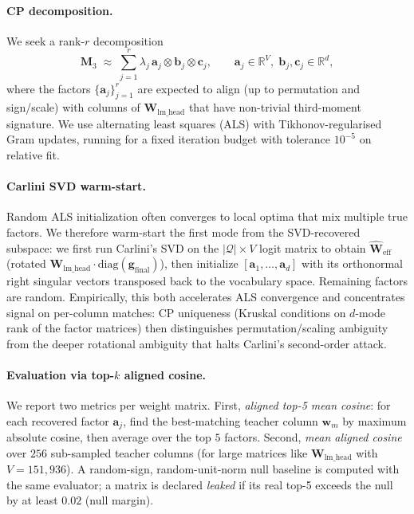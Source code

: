 \documentclass{article}
\newcommand{\R}{\mathbb{R}}
\newcommand{\cQ}{\mathcal{Q}}
\newcommand{\bW}{\mathbf{W}}
\newcommand{\bM}{\mathbf{M}}
\begin{document}
\paragraph{CP decomposition.} We seek a rank-$r$ decomposition
\begin{equation}\label{eq:cp}
 \bM_3 \;\approx\; \sum_{j=1}^{r} \lambda_j \, \mathbf{a}_j \otimes \mathbf{b}_j \otimes \mathbf{c}_j,
 \qquad \mathbf{a}_j \in \R^V,\; \mathbf{b}_j, \mathbf{c}_j \in \R^d,
\end{equation}
where the factors $\{\mathbf{a}_j\}_{j=1}^r$ are expected to align (up to permutation and sign/scale) with columns of $\bW_{\text{lm\_head}}$ that have non-trivial third-moment signature. We use alternating least squares (ALS) with Tikhonov-regularised Gram updates, running for a fixed iteration budget with tolerance $10^{-5}$ on relative fit.

\paragraph{Carlini SVD warm-start.} Random ALS initialization often converges to local optima that mix multiple true factors. We therefore warm-start the first mode from the SVD-recovered subspace: we first run Carlini's SVD on the $|\cQ| \times V$ logit matrix to obtain $\hat{\bW}_{\text{eff}}$ (rotated $\bW_{\text{lm\_head}} \cdot \text{diag}(\mathbf{g}_\text{final})$), then initialize $[\mathbf{a}_1, \ldots, \mathbf{a}_d]$ with its orthonormal right singular vectors transposed back to the vocabulary space. Remaining factors are random. Empirically, this both accelerates ALS convergence and concentrates signal on per-column matches: CP uniqueness (Kruskal conditions on $d$-mode rank of the factor matrices) then distinguishes permutation/scaling ambiguity from the deeper rotational ambiguity that halts Carlini's second-order attack.

\paragraph{Evaluation via top-$k$ aligned cosine.} We report two metrics per weight matrix. First, \emph{aligned top-5 mean cosine}: for each recovered factor $\mathbf{a}_j$, find the best-matching teacher column $\mathbf{w}_m$ by maximum absolute cosine, then average over the top $5$ factors. Second, \emph{mean aligned cosine} over $256$ sub-sampled teacher columns (for large matrices like $\bW_{\text{lm\_head}}$ with $V = 151{,}936$). A random-sign, random-unit-norm null baseline is computed with the same evaluator; a matrix is declared \emph{leaked} if its real top-5 exceeds the null by at least $0.02$ (null margin).
\end{document}

